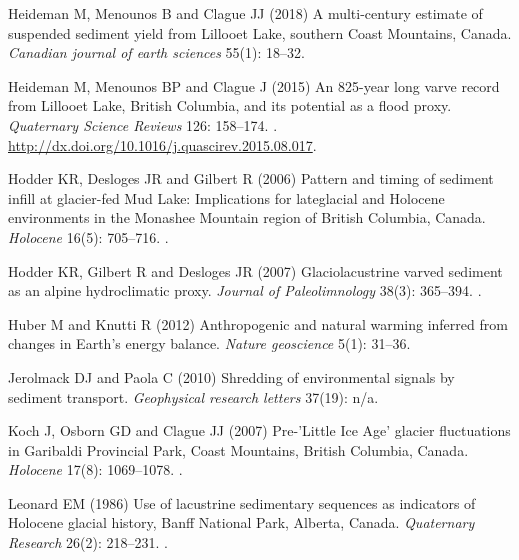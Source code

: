 \documentclass[Royal,times,doublespace,sageh]{sagej}
\begin{document}
\begin{thebibliography}{69}
Heideman M, Menounos B and Clague JJ (2018) {A multi-century estimate of
  suspended sediment yield from Lillooet Lake, southern Coast Mountains,
  Canada}.
\newblock \emph{Canadian journal of earth sciences} 55(1): 18--32.

Heideman M, Menounos BP and Clague J (2015) {An 825-year long varve record from
  Lillooet Lake, British Columbia, and its potential as a flood proxy}.
\newblock \emph{Quaternary Science Reviews} 126: 158--174.
\newblock {}.
\newblock \urlprefix\url{http://dx.doi.org/10.1016/j.quascirev.2015.08.017}.

Hodder KR, Desloges JR and Gilbert R (2006) {Pattern and timing of sediment
  infill at glacier-fed Mud Lake: Implications for lateglacial and Holocene
  environments in the Monashee Mountain region of British Columbia, Canada}.
\newblock \emph{Holocene} 16(5): 705--716.
\newblock {}.

Hodder KR, Gilbert R and Desloges JR (2007) {Glaciolacustrine varved sediment
  as an alpine hydroclimatic proxy}.
\newblock \emph{Journal of Paleolimnology} 38(3): 365--394.
\newblock {}.

Huber M and Knutti R (2012) {Anthropogenic and natural warming inferred from
  changes in Earth's energy balance}.
\newblock \emph{Nature geoscience} 5(1): 31--36.

Jerolmack DJ and Paola C (2010) {Shredding of environmental signals by sediment
  transport}.
\newblock \emph{Geophysical research letters} 37(19): n/a.

Koch J, Osborn GD and Clague JJ (2007) {Pre-'Little Ice Age' glacier
  fluctuations in Garibaldi Provincial Park, Coast Mountains, British Columbia,
  Canada}.
\newblock \emph{Holocene} 17(8): 1069--1078.
\newblock {}.

Leonard EM (1986) {Use of lacustrine sedimentary sequences as indicators of
  Holocene glacial history, Banff National Park, Alberta, Canada}.
\newblock \emph{Quaternary Research} 26(2): 218--231.
\newblock {}.


\end{thebibliography}
\end{document}
